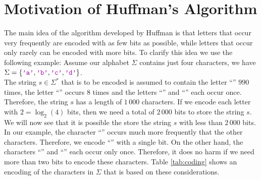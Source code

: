 \section[Motivation]{Motivation of  Huffman's Algorithm \label{sec:huffman}}
The main idea of the
algorithm developed by Huffman is that letters that occur very frequently are encoded with
as few bits as possible, while letters that occur only rarely can be encoded with more bits. 
To clarify this idea we use the following example:  Assume our alphabet $\Sigma$ contains just four characters, we have
\\[0.2cm]
\hspace*{1.3cm}
$\Sigma = \{ \mytt{'a'}, \mytt{'b'}, \mytt{'c'}, \mytt{'d'} \}$. 
\\[0.2cm]
The string $s \in \Sigma^*$ that is to be encoded is assumed to contain the letter
``'' $990$ times, the letter ``'' occurs $8$ times and the letters ``'' and
``'' each occur once.  Therefore, the string $s$ has a length of $1\,000$ characters.
If we encode each letter with $2 = \log_2(4)$ bits, then we need a total of $2\,000$ bits to store the string $s$.
We will now see that it is possible the store the string $s$ with less than $2\,000$ bits.
In our example, the character ``'' occurs much more frequently that the other characters.  Therefore, we
encode ``'' with a single bit.  On the other hand, the characters ``'' and ``''
each occur only once.  Therefore, it does no harm if we need more than two bits to encode these characters.
Table \ref{tab:coding} shows an encoding of the characters in $\Sigma$ that is based on these considerations.

